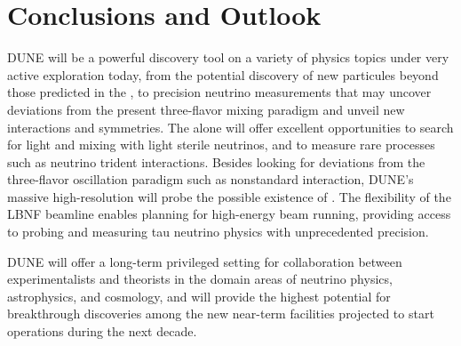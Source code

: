 \section{Conclusions and Outlook}
DUNE will be a powerful discovery tool on a variety of physics topics under very active exploration today, from the potential discovery of new particules beyond those predicted in the , to precision neutrino measurements that may uncover deviations from the present three-flavor mixing paradigm and unveil new interactions and symmetries.
The  alone will offer excellent opportunities to search for light  and mixing with light sterile neutrinos, and to measure rare processes such as neutrino trident interactions. Besides looking for deviations from the three-flavor oscillation paradigm such as nonstandard interaction, DUNE's massive high-resolution  will probe  the possible existence of . The flexibility of the LBNF beamline enables planning for high-energy beam running, providing access to probing and measuring tau neutrino physics with unprecedented precision.

DUNE will offer a long-term privileged setting for collaboration between experimentalists and theorists in the domain areas of neutrino physics, astrophysics, and cosmology, and will provide the highest potential for breakthrough discoveries among the new near-term facilities projected to start operations during the next decade.

